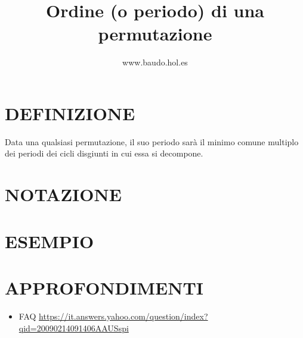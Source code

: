 \documentclass[a4paper,10pt]{article}
\title{Ordine (o periodo) di una permutazione}
\author{www.baudo.hol.es}
\begin{document}
\maketitle

\section{DEFINIZIONE}
Data una qualsiasi permutazione, il suo periodo sarà il minimo comune multiplo dei periodi dei cicli disgiunti in cui essa si decompone. 

\section{NOTAZIONE}

\section{ESEMPIO}

\section{APPROFONDIMENTI}
\begin{itemize}
 \item FAQ \url{https://it.answers.yahoo.com/question/index?qid=20090214091406AAUSspi}
\end{itemize}
\end{document}

